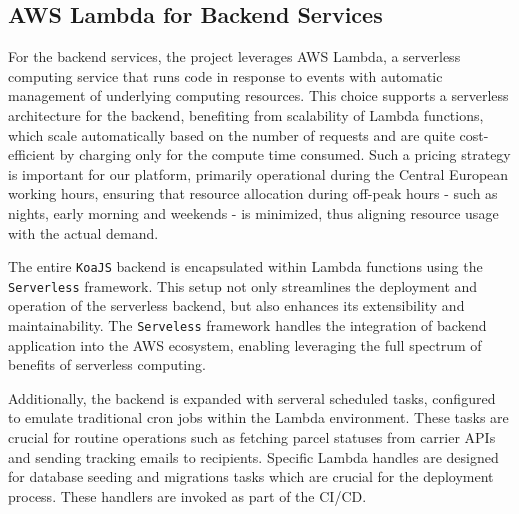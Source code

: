 \subsection{AWS Lambda for Backend Services}
\label{subsec:aws-lambda-backend}
For the backend services, the project leverages \ac{AWS} Lambda, a serverless computing service that runs code in response to events with automatic management of underlying computing resources.
This choice supports a serverless architecture for the backend, benefiting from scalability of Lambda functions, which scale automatically based on the number of requests and are quite cost-efficient by charging only for the compute time consumed.
Such a pricing strategy is important for our platform, primarily operational during the Central European working hours, ensuring that resource allocation during off-peak hours - such as nights, early morning and weekends - is minimized, thus aligning resource usage with the actual demand.

The entire \texttt{KoaJS} backend is encapsulated within Lambda functions using the \texttt{Serverless} framework. 
This setup not only streamlines the deployment and operation of the serverless backend, but also enhances its extensibility and maintainability.
The \texttt{Serveless} framework handles the integration of backend application into the \ac{AWS} ecosystem, enabling leveraging the full spectrum of benefits of serverless computing.

Additionally, the backend is expanded with serveral scheduled tasks, configured to emulate traditional cron jobs within the Lambda environment.
These tasks are crucial for routine operations such as fetching parcel statuses from carrier APIs and sending tracking emails to recipients.
Specific Lambda handles are designed for database seeding and migrations tasks which are crucial for the deployment process.
These handlers are invoked as part of the \ac{CI}/\ac{CD}.

